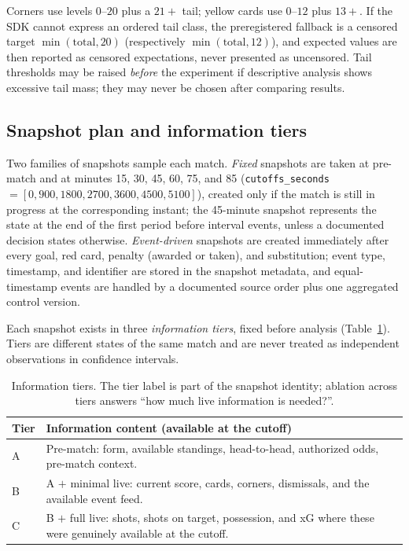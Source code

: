 \documentclass[11pt]{article}
\begin{document}
Corners use levels $0$--$20$ plus a $21+$ tail; yellow cards use $0$--$12$ plus
$13+$. If the SDK cannot express an ordered tail class, the preregistered
fallback is a censored target $\min(\text{total},20)$ (respectively
$\min(\text{total},12)$), and expected values are then reported as censored
expectations, never presented as uncensored. Tail thresholds may be raised
\emph{before} the experiment if descriptive analysis shows excessive tail
mass; they may never be chosen after comparing results.

\subsection{Snapshot plan and information tiers}
\label{sec:snapshots}

Two families of snapshots sample each match. \emph{Fixed} snapshots are taken
at pre-match and at minutes 15, 30, 45, 60, 75, and 85
(\texttt{cutoffs\_seconds} $=[0,900,1800,2700,3600,4500,5100]$), created only
if the match is still in progress at the corresponding instant; the 45-minute
snapshot represents the state at the end of the first period before interval
events, unless a documented decision states otherwise.
\emph{Event-driven} snapshots are created immediately after every goal, red
card, penalty (awarded or taken), and substitution; event type, timestamp,
and identifier are stored in the snapshot metadata, and equal-timestamp
events are handled by a documented source order plus one aggregated control
version.

Each snapshot exists in three \emph{information tiers}, fixed before analysis
(Table~\ref{tab:tiers}). Tiers are different states of the same match and are
never treated as independent observations in confidence intervals.

\begin{table}[t]
\centering
\small
\begin{tabular}{@{}lp{13.2cm}@{}}
\toprule
\textbf{Tier} & \textbf{Information content (available at the cutoff)} \\
\midrule
A & Pre-match: form, available standings, head-to-head, authorized odds,
pre-match context. \\
B & A $+$ minimal live: current score, cards, corners, dismissals, and the
available event feed. \\
C & B $+$ full live: shots, shots on target, possession, and xG where these
were genuinely available at the cutoff. \\
\bottomrule
\end{tabular}
\caption{Information tiers. The tier label is part of the snapshot identity;
ablation across tiers answers ``how much live information is needed?''.}
\label{tab:tiers}
\end{table}
\end{document}
